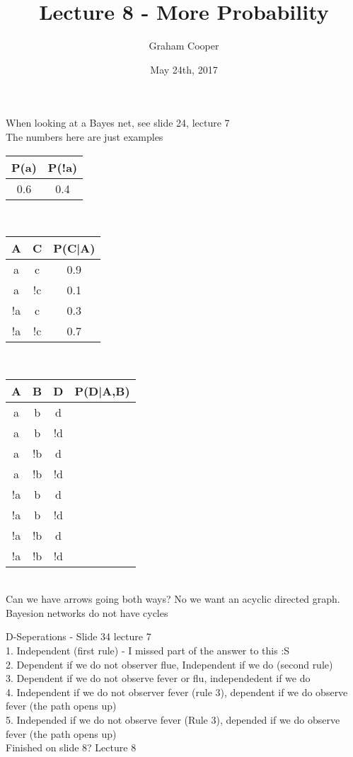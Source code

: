 \documentclass[12pt]{article}
\title{\vspace{-15ex}Lecture 8 - More Probability\vspace{-1ex}}
\date{May 24th, 2017}
\author{Graham Cooper}
\begin{document}
	\maketitle
	
	When looking at a Bayes net, see slide 24, lecture 7\\
	The numbers here are just examples\\
	
	\begin{tabular}{c | c}
		P(a) & P(!a) \\ \hline
		0.6 & 0.4
	\end{tabular}\\

	\begin{tabular}{c | c | c}
		A & C & P(C|A) \\ \hline
		a & c & 0.9 \\
		a & !c & 0.1 \\
		!a & c & 0.3 \\
		!a & !c & 0.7 \\
	\end{tabular}\\
	
	\begin{tabular}{c c c | c}
		A & B & D & P(D|A,B) \\ \hline
		a & b & d & \\
		a & b & !d & \\
		a & !b & d & \\
		a & !b & !d & \\
		!a & b & d & \\
		!a & b & !d & \\
		!a & !b & d & \\
		!a & !b & !d & \\	
	\end{tabular}\\

	Can we have arrows going both ways? No we want an acyclic directed graph.\\ Bayesion networks do not have cycles
	
	D-Seperations - Slide 34 lecture 7\\
	1. Independent (first rule) - I missed part of the answer to this :S\\
	2. Dependent if we do not observer flue, Independent if we do (second rule)\\
	3. Dependent if we do not observe fever or flu, independedent if we do\\
	4. Independent if we do not observer fever (rule 3), dependent if we do observe fever (the path opens up)\\
	5. Independed if we do not observe fever (Rule 3), depended if we do observe fever (the path opens up)\\

	Finished on slide 8? Lecture 8

	
\end{document}
